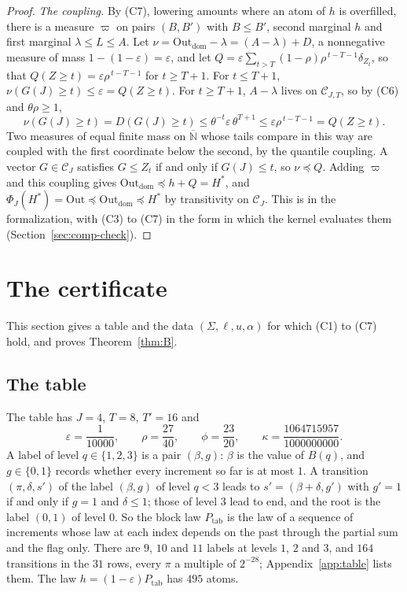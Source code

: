 \documentclass[11pt]{amsart}
\theoremstyle{definition}
\numberwithin{equation}{section}
\newcommand{\Nb}{\overline{\mathbb{N}}}
\newcommand{\cC}{\mathcal{C}}
\newcommand{\eps}{\varepsilon}
\newcommand{\stle}{\preceq}
\begin{document}
\begin{proof}
\emph{The coupling.} By (C7), lowering amounts where an atom of $h$ is overfilled, there is a measure $\varpi$ on pairs $(B,B')$ with $B\le B'$, second marginal $h$ and first marginal $\lambda\le L\le A$. Let $\nu=\mathrm{Out}_{\mathrm{dom}}-\lambda=(A-\lambda)+D$, a nonnegative measure of mass $1-(1-\eps)=\eps$, and let $Q=\eps\sum_{t>T}(1-\rho)\rho^{\,t-T-1}\delta_{Z_t}$, so that $Q(Z\ge t)=\eps\rho^{\,t-T-1}$ for $t\ge T+1$. For $t\le T+1$, $\nu(G(J)\ge t)\le\eps=Q(Z\ge t)$. For $t\ge T+1$, $A-\lambda$ lives on $\cC_{J,T}$, so by (C6) and $\theta\rho\ge1$,
\[
\nu(G(J)\ge t)=D(G(J)\ge t)\le\theta^{-t}\eps\,\theta^{T+1}\le\eps\rho^{\,t-T-1}=Q(Z\ge t).
\]
Two measures of equal finite mass on $\Nb$ whose tails compare in this way are coupled with the first coordinate below the second, by the quantile coupling. A vector $G\in\cC_J$ satisfies $G\le Z_t$ if and only if $G(J)\le t$, so $\nu\stle Q$. Adding $\varpi$ and this coupling gives $\mathrm{Out}_{\mathrm{dom}}\stle h+Q=H^*$, and $\Phi_J(H^*)=\mathrm{Out}\stle\mathrm{Out}_{\mathrm{dom}}\stle H^*$ by transitivity on $\cC_J$. This is  in the formalization, with (C3) to (C7) in the form in which the kernel evaluates them (Section~\ref{sec:comp-check}).
\end{proof}

\section{The certificate}\label{sec:certificate}

This section gives a table and the data $(\Sigma,\ell,u,\alpha)$ for which (C1) to (C7) hold, and proves Theorem~\ref{thm:B}.

\subsection{The table}
The table has $J=4$, $T=8$, $T'=16$ and
\[
\eps=\frac1{10000},\qquad\rho=\frac{27}{40},\qquad\phi=\frac{23}{20},\qquad\kappa=\frac{1064715957}{1000000000}.
\]
A label of level $q\in\{1,2,3\}$ is a pair $(\beta,g)$: $\beta$ is the value of $B(q)$, and $g\in\{0,1\}$ records whether every increment so far is at most $1$. A transition $(\pi,\delta,s')$ of the label $(\beta,g)$ of level $q<3$ leads to $s'=(\beta+\delta,g')$ with $g'=1$ if and only if $g=1$ and $\delta\le1$; those of level $3$ lead to $\mathrm{end}$, and the root is the label $(0,1)$ of level $0$. So the block law $P_{\mathrm{tab}}$ is the law of a sequence of increments whose law at each index depends on the past through the partial sum and the flag only. There are $9$, $10$ and $11$ labels at levels $1$, $2$ and $3$, and $164$ transitions in the $31$ rows, every $\pi$ a multiple of $2^{-28}$; Appendix~\ref{app:table} lists them. The law $h=(1-\eps)P_{\mathrm{tab}}$ has $495$ atoms.
\end{document}
